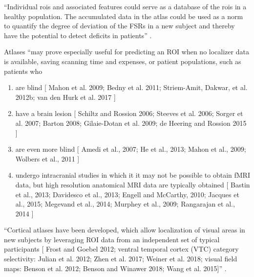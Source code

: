 %
``Individual \acp{roi} and associated features could serve as a database of the
\acp{roi} in a healthy population.
%
The accumulated data in the atlas could be used as a norm to quantify the degree
of deviation of the FSRs in a new subject and thereby have the potential to
detect deficits in patients'' \citep{zhen2015quantifying}.

%
Atlases ``may prove especially useful for predicting an ROI when no localizer
data is available, saving scanning time and expenses, or
%
patient populations, such as patients who
%
\begin{enumerate}

\item are blind [
        Mahon et al. 2009;
        Bedny et al. 2011;
        Striem-Amit, Dakwar, et al. 2012b;
        van den Hurk et al. 2017
    ] \citep{rosenke2021probabilistic}

\item have a brain lesion [
        Schiltz and Rossion 2006;
        Steeves et al. 2006;
        Sorger et al. 2007;
        Barton 2008;
        Gilaie-Dotan et al. 2009;
        de Heering and Rossion 2015
    ] \citep{rosenke2021probabilistic}

\item are even more blind [
        Amedi et al., 2007;
        He et al., 2013;
        Mahon et al., 2009;
        Wolbers et al., 2011
    ] \citep{weiner2018defining}

\item undergo intracranial studies in which it it may not be possible to obtain
    fMRI data, but high resolution anatomical MRI data are typically obtained [
        Bastin et al., 2013;
        Davidesco et al., 2013;
        Engell and McCarthy, 2010;
        Jacques et al., 2015;
        Megevand et al., 2014;
        Murphey et al., 2009;
        Rangarajan et al., 2014
    ] \citep{weiner2018defining}

\end{enumerate}


``Cortical atlases have been developed, which allow localization of visual areas
in new subjects by leveraging ROI data from an independent set of typical
participants [
    Frost and Goebel 2012;
    ventral temporal cortex (VTC) category selectivity:
    Julian et al. 2012;
    Zhen et al. 2017;
    Weiner et al. 2018;
    visual field maps:
    Benson et al. 2012;
    Benson and Winawer 2018;
    Wang et al. 2015]'' \citep{rosenke2021probabilistic}.



